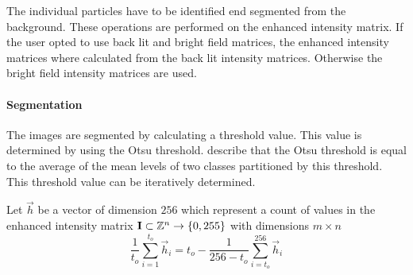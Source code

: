 The individual particles have to be identified end segmented from the background. These operations are performed on the enhanced intensity matrix. If the user opted to use back lit and bright field matrices, the enhanced intensity matrices where calculated from the back lit intensity matrices. Otherwise the bright field intensity matrices are used.

\paragraph{Segmentation}
The images are segmented by calculating a threshold value. This value is determined by using the Otsu threshold. \citeauthor{Xu2011956} \cite{Xu2011956} describe that the Otsu threshold is equal to the average of the mean levels of two classes partitioned by this threshold. This threshold value can be iteratively determined.

\begin{sBox}
	Let $\vec{h}$ be a vector of dimension $256$ which represent a count of values in the enhanced intensity matrix $\mat{I} \subset \mathbb{Z}^n \rightarrow \{0, 255\}$ with dimensions $m \times n$
	\begin{equation}\label{OtsuMethodEq}
		\frac{1}{t_o}\sum\limits_{i=1}^{t_o} \vec{h}_i = t_o - \frac{1}{256 - t_o}\sum\limits_{i=t_o}^{256} \vec{h}_i
	\end{equation}
\end{sBox}

